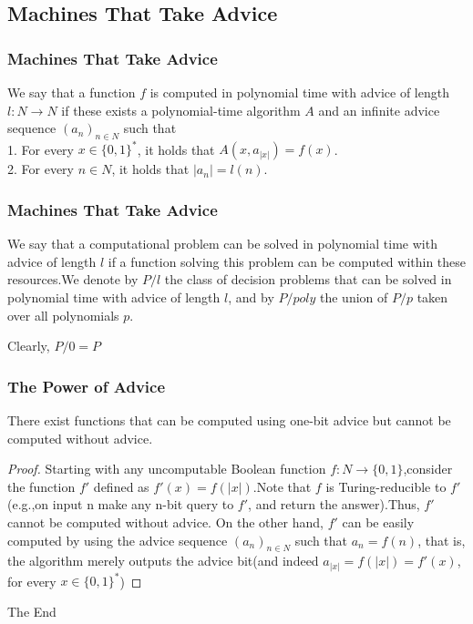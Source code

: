 \documentclass{beamer}
\begin{document}
\subsection{Machines That Take Advice}

\begin{frame}
\frametitle{Machines That Take Advice}
\begin{definition}
We say that a function $f$ is computed in polynomial time with advice of length $l : N \rightarrow N$ if these exists a polynomial-time algorithm $A$ and an infinite advice sequence $(a_{n})_{n \in N}$ such that \\
1. For every $x \in \{0,1\}^{*}$, it holds that $A(x, a_{|x|}) = f(x)$.\\
2. For every $n \in N$, it holds that $|a_{n}| = l(n)$. 
\end{definition}

\end{frame}


\begin{frame}
\frametitle{Machines That Take Advice}
\begin{definition}[P/poly]
We say that a computational problem can be solved in polynomial time with advice of length $l$ if a function solving this problem can be computed within these resources.We denote by $P/l$ the class of decision problems that can be solved in polynomial time with advice of length $l$, and by $P/poly$ the union of $P/p$ taken over all polynomials $p$.
\end{definition}
Clearly, $P/0 = P$
\end{frame}

\begin{frame}
\frametitle{The Power of Advice}
\begin{theorem}
There exist functions that can be computed using one-bit advice but cannot be computed without advice.
\end{theorem}
\begin{proof}
Starting with any uncomputable Boolean function $f : N \rightarrow \{0, 1\}$,consider the function $f'$ defined as $f'(x) = f(|x|)$.Note that $f$ is Turing-reducible to $f'$ (e.g.,on input n make any n-bit query to $f'$, and return the answer).Thus, $f'$ cannot be
computed without advice. On the other hand, $f'$ can be easily computed by using the advice sequence $(a_{n})_{n \in N}$ such that $a_{n} = f(n)$, that is, the algorithm merely outputs the advice bit(and indeed $a_{|x|} = f(|x|) = f'(x)$, for every $x \in \{0,1\}^{*}$)
\end{proof}
\end{frame}
\begin{frame}
\Huge{\centerline{The End}}
\end{frame}

\end{document}
